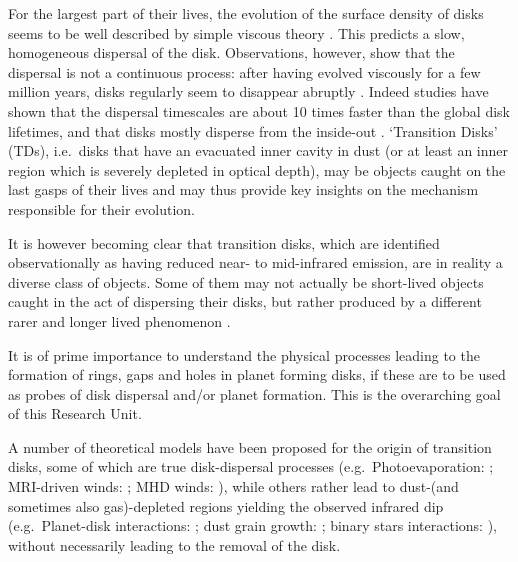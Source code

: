 \documentclass[10pt,fleqn,twoside,a4paper]{article}
\begin{document}
For the largest part
of their lives, the evolution of the surface density of disks seems to be well
described by simple viscous theory 
\citep[e.g.][]{1998ApJ...495..385H, 1974MNRAS.168..603L}.
This predicts a slow, homogeneous dispersal of the
disk. Observations, however, show that the dispersal is not a
continuous process: after having evolved viscously for a few million
years, disks regularly seem to disappear abruptly 
\citep[e.g.,][]{1995ApJS..101..117K, 2010ApJS..186..111L}.
Indeed studies have shown that the dispersal
timescales are about 10 times faster than the global disk lifetimes, and
that disks mostly disperse from the inside-out 
\citep[e.g.,][]{2011MNRAS.410..671E, 2013MNRAS.428.3327K}. 
`Transition Disks' (TDs), i.e.\ disks
that have an evacuated inner cavity in dust (or at least an inner region
which is severely depleted in optical depth), may be objects caught on
the last gasps of their lives and may thus provide key insights on the
mechanism responsible for their evolution. 

It is however becoming clear that transition disks, which are
identified observationally as having reduced near- to mid-infrared
emission,  are in reality a diverse class of objects. Some of them may
not actually be short-lived objects caught in the act of dispersing
their disks, but rather produced by a different rarer and longer lived
phenomenon 
\citep[see e.g.,][]{2016PASA...33....5O, 2016ApJ...825...77D}.
\begin{highlight}
It is of prime
importance to understand the physical processes leading to the
formation of rings, gaps and holes in planet forming disks, if these are to
be used as probes of disk dispersal and/or planet formation. This is
the overarching goal of this Research Unit. 
\end{highlight}

A number of theoretical models have been proposed for the origin of
transition disks, some of which are true disk-dispersal processes
(e.g.\ Photoevaporation: \citep{2001MNRAS.328..485C}; MRI-driven
winds: \citep{2009ApJ...691L..49S}; MHD winds: \citep{2016ApJ...821...80B}), 
while others
rather lead to dust-(and sometimes also gas)-depleted regions yielding
the observed infrared dip (e.g.\ Planet-disk interactions: 
\citep{2005ApJ...630L.185C}; dust grain growth: \citep{2005A&A...434..971D}; 
binary stars interactions: \citep{1992ApJ...395L.115M}), without necessarily leading to
the removal of the disk.  
\end{document}
